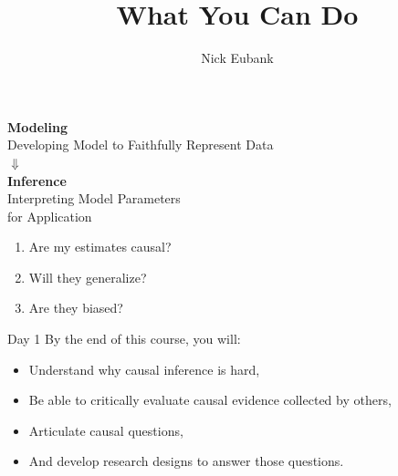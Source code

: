 \documentclass[11pt]{beamer}
\title{What You Can Do}
\author{\small Nick Eubank}
\date{\vspace*{.3in} \date}
\begin{document}
\begin{frame}[c]
\maketitle
\end{frame}


\begin{frame}[c]
    \centering
    \textbf{Modeling} \\
    Developing Model to Faithfully Represent Data \\
    \vspace*{0.2cm}
    \pause $\Downarrow$ \\
    \vspace*{0.2cm}
     \textbf{Inference} \\
    Interpreting Model Parameters \\
    for Application \\
    \vspace{1cm}
    \begin{enumerate}
        \pause \item Are my estimates causal?
        \pause \item Will they generalize?
        \pause \item Are they biased?
    \end{enumerate}
  \end{frame}


\begin{frame}[c]{Day 1}
\pause By the end of this course, you will:
    \begin{itemize}
        \item Understand why causal inference is hard, \\
        \item Be able to critically evaluate causal evidence collected by others, \\
        \item Articulate causal questions, \\
        \item And develop research designs to answer those questions. \\
    \end{itemize}
    \end{frame}
\end{document}
